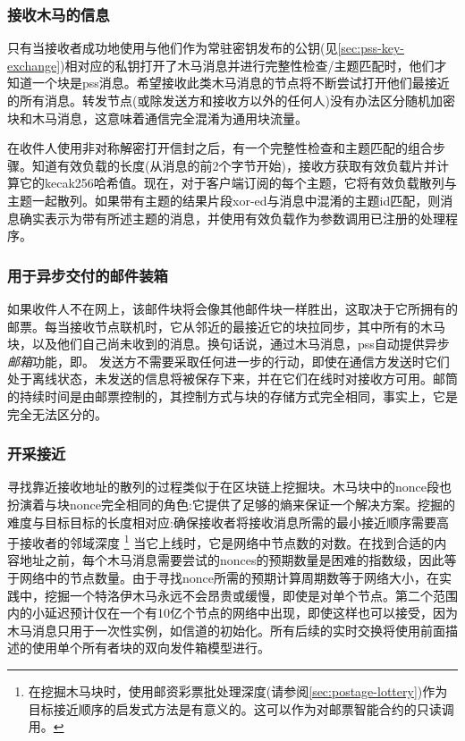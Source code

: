\subsubsection{接收木马的信息}

只有当接收者成功地使用与他们作为常驻密钥发布的公钥(见\ref{sec:pss-key-exchange})相对应的私钥打开了木马消息并进行完整性检查/主题匹配时，他们才知道一个块是pss消息。希望接收此类木马消息的节点将不断尝试打开他们最接近的所有消息。转发节点(或除发送方和接收方以外的任何人)没有办法区分随机加密块和木马消息，这意味着通信完全混淆为通用块流量。

在收件人使用非对称解密打开信封之后，有一个完整性检查和主题匹配的组合步骤。知道有效负载的长度(从消息的前2个字节开始)，接收方获取有效负载片并计算它的kecak256哈希值。现在，对于客户端订阅的每个主题，它将有效负载散列与主题一起散列。如果带有主题的结果片段xor-ed与消息中混淆的主题id匹配，则消息确实表示为带有所述主题的消息，并使用有效负载作为参数调用已注册的处理程序。

\subsubsection{用于异步交付的邮件装箱}

如果收件人不在网上，该邮件块将会像其他邮件块一样胜出，这取决于它所拥有的邮票。每当接收节点联机时，它从邻近的最接近它的块拉同步，其中所有的木马块，以及他们自己尚未收到的消息。换句话说，通过木马消息，pss自动提供异步\emph{邮箱}功能，即。
发送方不需要采取任何进一步的行动，即使在通信方发送时它们处于离线状态，未发送的信息将被保存下来，并在它们在线时对接收方可用。邮筒的持续时间是由邮票控制的，其控制方式与块的存储方式完全相同，事实上，它是完全无法区分的。

\subsubsection{开采接近}

寻找靠近接收地址的散列的过程类似于在区块链上挖掘块。木马块中的nonce段也扮演着与块nonce完全相同的角色:它提供了足够的熵来保证一个解决方案。挖掘的难度与目标目标的长度相对应:确保接收者将接收消息所需的最小接近顺序需要高于接收者的邻域深度%
%
\footnote{在挖掘木马块时，使用邮资彩票批处理深度(请参阅\ref{sec:postage-lottery})作为目标接近顺序的启发式方法是有意义的。这可以作为对邮票智能合约的只读调用。}
%
当它上线时，它是网络中节点数的对数。在找到合适的内容地址之前，每个木马消息需要尝试的nonces的预期数量是困难的指数级，因此等于网络中的节点数量。由于寻找nonce所需的预期计算周期数等于网络大小，在实践中，挖掘一个特洛伊木马永远不会昂贵或缓慢，即使是对单个节点。第二个范围内的小延迟预计仅在一个有10亿个节点的网络中出现，即使这样也可以接受，因为木马消息只用于一次性实例，如信道的初始化。所有后续的实时交换将使用前面描述的使用单个所有者块的双向发件箱模型进行。


